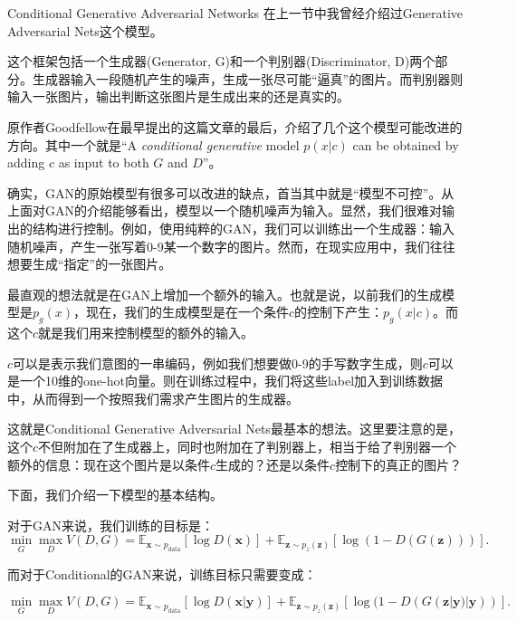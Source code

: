 \documentclass{ctexart}
\begin{document}
	\begin{section}{Conditional Generative Adversarial Networks\cite{mirza2014conditional}}
		在上一节中我曾经介绍过Generative Adversarial Nets这个模型。
		
		这个框架包括一个生成器(Generator, G)和一个判别器(Discriminator, D)两个部分。生成器输入一段随机产生的噪声，生成一张尽可能“逼真”的图片。而判别器则输入一张图片，输出判断这张图片是生成出来的还是真实的。
		
		原作者Goodfellow在最早提出的这篇文章的最后，介绍了几个这个模型可能改进的方向。其中一个就是“A \emph{conditional generative} model $p(x|c)$ can be obtained by adding $c$ as input to both $G$ and $D$”。
		
		确实，GAN的原始模型有很多可以改进的缺点，首当其中就是“模型不可控”。从上面对GAN的介绍能够看出，模型以一个随机噪声为输入。显然，我们很难对输出的结构进行控制。例如，使用纯粹的GAN，我们可以训练出一个生成器：输入随机噪声，产生一张写着0-9某一个数字的图片。然而，在现实应用中，我们往往想要生成“指定”的一张图片。
		
		最直观的想法就是在GAN上增加一个额外的输入。也就是说，以前我们的生成模型是$p_g(x)$，现在，我们的生成模型是在一个条件$c$的控制下产生：$p_g(x|c)$。而这个$c$就是我们用来控制模型的额外的输入。
		
		$c$可以是表示我们意图的一串编码，例如我们想要做0-9的手写数字生成，则$c$可以是一个10维的one-hot向量。则在训练过程中，我们将这些label加入到训练数据中，从而得到一个按照我们需求产生图片的生成器。
		
		这就是Conditional Generative Adversarial Nets最基本的想法。这里要注意的是，这个$c$不但附加在了生成器上，同时也附加在了判别器上，相当于给了判别器一个额外的信息：现在这个图片是以条件$c$生成的？还是以条件$c$控制下的真正的图片？
		
		下面，我们介绍一下模型的基本结构。
		
		对于GAN来说，我们训练的目标是：
		\begin{equation}
			\mathop{\min}_{G}\mathop{\max}_{D}V(D,G)=\mathbb{E}_{\boldsymbol{x}\sim p_{\text{data}}}\left[\log D(\boldsymbol{x})\right]+\mathbb{E}_{\boldsymbol{z}\sim p_z(\boldsymbol{z})}\left[\log(1-D(G(\boldsymbol{z})))\right].
		\end{equation}
		
		而对于Conditional的GAN来说，训练目标只需要变成：
		
		\begin{equation}
			\mathop{\min}_{G}\mathop{\max}_{D}V(D,G)=\mathbb{E}_{\boldsymbol{x}\sim p_{\text{data}}}\left[\log D(\boldsymbol{x}|\boldsymbol{y})\right]+\mathbb{E}_{\boldsymbol{z}\sim p_z(\boldsymbol{z})}\left[\log(1-D(G(\boldsymbol{z}|\boldsymbol{y})|\boldsymbol{y}))\right].
		\end{equation}
		

\end{section}
\end{document}

